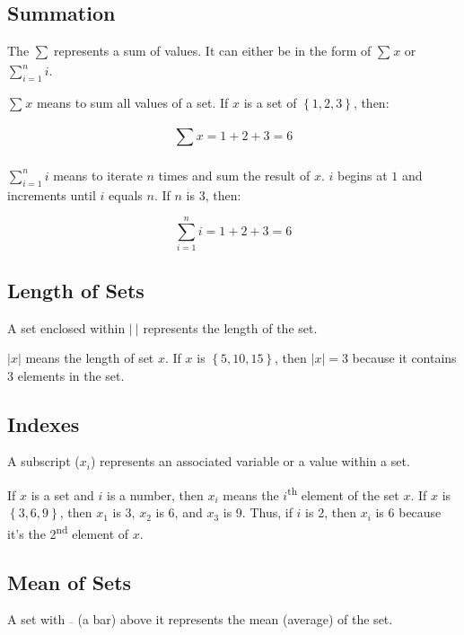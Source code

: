 \documentclass{article}
\begin{document}
\begin{sloppypar}
\hypertarget{summation}{%
\subsection{Summation}\label{summation}}

The \(\sum_{}^{}\ \)represents a sum of values. It can either be in the
form of \(\sum_{}^{}x\) or \(\sum_{i = 1}^{n}i\).

\(\sum_{}^{}x\) means to sum all values of a set. If \(x\) is a set of
\(\left\{ 1,2,3 \right\}\), then:

\[\sum_{}^{}x = 1 + 2 + 3 = 6\]

\(\sum_{i = 1}^{n}i\) means to iterate \(n\) times and sum the result of
\(x\). \(i\) begins at \(1\) and increments until \(i\) equals \(n\). If
\(n\) is 3, then:

\[\sum_{i = 1}^{n}i = 1 + 2 + 3 = 6\]

\hypertarget{length-of-sets}{%
\subsection{Length of Sets}\label{length-of-sets}}

A set enclosed within \(\left| \  \right|\) represents the length of the
set.

\(\left| x \right|\) means the length of set \(x\). If \(x\) is
\(\left\{ 5,10,15 \right\}\), then \(\left| x \right| = 3\) because it
contains 3 elements in the set.

\hypertarget{indexes}{%
\subsection{Indexes}\label{indexes}}

A subscript (\(x_{i}\)) represents an associated variable or a value
within a set.

If \(x\) is a set and \(i\) is a number, then \(x_{i}\) means the
\(i\)\textsuperscript{th} element of the set \(x\). If \(x\) is
\(\left\{ 3,6,9 \right\}\), then \(x_{1}\) is 3, \(x_{2}\) is 6, and
\(x_{3}\) is 9. Thus, if \(i\) is 2, then \(x_{i}\) is 6 because it's
the 2\textsuperscript{nd} element of \(x\).

\hypertarget{mean-of-sets}{%
\subsection{Mean of Sets}\label{mean-of-sets}}

A set with \(\overline{}\) (a bar) above it represents the mean
(average) of the set.


\end{sloppypar}
\end{document}

